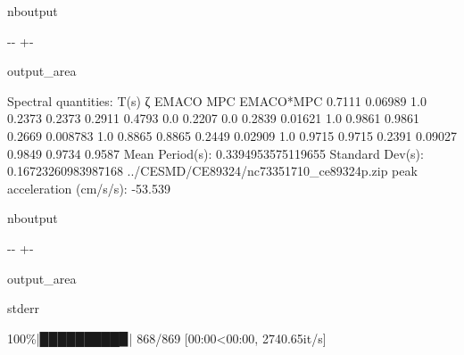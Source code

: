 \documentclass[letterpaper,10pt,english]{sphinxmanual}
\begin{document}
\begin{sphinxuseclass}{nboutput}
{

\kern-\sphinxverbatimsmallskipamount\kern-\baselineskip
\kern+\FrameHeightAdjust\kern-\fboxrule
\vspace{\nbsphinxcodecellspacing}

\begin{sphinxuseclass}{output_area}
\begin{sphinxuseclass}{}


\begin{sphinxVerbatim}[commandchars=\\\{\}]
Spectral quantities:
       T(s)        ζ        EMACO        MPC     EMACO*MPC
      0.7111     0.06989    1.0        0.2373     0.2373
      0.2911     0.4793     0.0        0.2207     0.0
      0.2839     0.01621    1.0        0.9861     0.9861
      0.2669     0.008783   1.0        0.8865     0.8865
      0.2449     0.02909    1.0        0.9715     0.9715
      0.2391     0.09027    0.9849     0.9734     0.9587
Mean Period(s): 0.3394953575119655
Standard Dev(s): 0.16723260983987168
../CESMD/CE89324/nc73351710\_ce89324p.zip
peak acceleration (cm/s/s): -53.539
\end{sphinxVerbatim}



\end{sphinxuseclass}
\end{sphinxuseclass}
}

\end{sphinxuseclass}
\begin{sphinxuseclass}{nboutput}
{

\kern-\sphinxverbatimsmallskipamount\kern-\baselineskip
\kern+\FrameHeightAdjust\kern-\fboxrule
\vspace{\nbsphinxcodecellspacing}

\begin{sphinxuseclass}{output_area}
\begin{sphinxuseclass}{stderr}


\begin{sphinxVerbatim}[commandchars=\\\{\}]
100\%|█████████▉| 868/869 [00:00<00:00, 2740.65it/s]
\end{sphinxVerbatim}



\end{sphinxuseclass}
\end{sphinxuseclass}
}

\end{sphinxuseclass}
\end{document}
